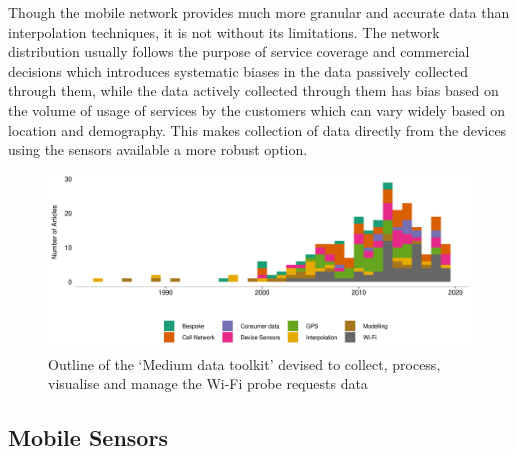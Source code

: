 Though the mobile network provides much more granular and accurate data than interpolation techniques, it is not without its limitations.
The network distribution usually follows the purpose of service coverage and commercial decisions which introduces systematic biases in the data passively collected through them, while the data actively collected through them has bias based on the volume of usage of services by the customers which can vary widely based on location and demography.
This makes collection of data directly from the devices using the sensors available a more robust option.

\begin{figure}
  \includegraphics{images/literature-tech-timeline.png}
  \caption{Outline of the `Medium data toolkit' devised to collect, process, visualise and manage the Wi-Fi probe requests data}
  \label{figure:literature:tech:timeline}
\end{figure}

\subsection{Mobile Sensors}


